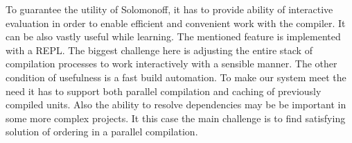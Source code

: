 To guarantee the utility of Solomonoff, it has to provide ability of interactive evaluation in order to enable efficient and convenient work with the compiler. It can be also vastly useful while learning. The mentioned feature is implemented with a REPL. The biggest challenge here is adjusting the entire stack of compilation processes to work interactively with a sensible manner. The other condition of usefulness is a fast build automation. To make our system meet the
need it has to support both parallel compilation and caching of previously compiled units. Also the ability to resolve dependencies may be be important in some more complex projects. It this case the main challenge is to find satisfying solution of ordering in a parallel compilation.
